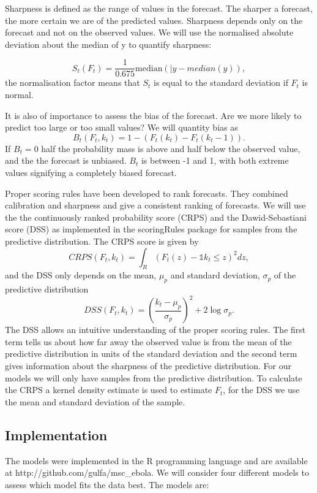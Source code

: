 \documentclass[12pt]{article}
\begin{document}
Sharpness is defined as the range of values in the forecast. The sharper a forecast, the more certain we are of the predicted values. Sharpness depends only on the forecast and not on the observed values. We will use the normalised absolute deviation about the median of y to quantify sharpness:

\[ S_t(F_t) = \frac{1}{0.675} \text{median}(|y - median(y)),\]
the normalisation factor means that $S_t$ is equal to the standard deviation if $F_t$ is normal.

It is also of importance to assess the bias of the forecast. Are we more likely to predict too large or too small values? We will quantity bias as
\[B_t(F_t, k_t) = 1 - (F_t(k_t) - F_t(k_t - 1)).\]
If $B_t=0$ half the probability mass is above and half below the observed value, and the the forecast is unbiased. $B_t$ is between -1 and 1, with both extreme values signifying a completely biased forecast.

Proper scoring rules have been developed to rank forecasts. They combined calibration and sharpness and give a consistent ranking of forecasts. We will use the the continuously ranked probability score (CRPS) and the Dawid-Sebastiani score (DSS) as implemented in the scoringRules package \cite{jordanEvaluatingProbabilisticForecasts2018} for samples from the predictive distribution. The CRPS score is given by 
\[CRPS(F_t,k_t) = \int_R(F_t(z) - \mathds{1}{k_t \leq z})^2 dz,\]
and the DSS only depends on the mean, $\mu_p$ and standard deviation, $\sigma_p$ of the predictive distribution
\[DSS(F_t, k_t) = \left(\frac{k_t- \mu_p}{\sigma_p}\right)^2 + 2\log\sigma_p.\]
The DSS allows an intuitive understanding of the proper scoring rules. The first term tells us about how far away the observed value is from the mean of the predictive distribution in units of the standard deviation and the second term gives information about the sharpness of the predictive distribution. For our models we will only have samples from the predictive distribution. To calculate the CRPS a kernel density estimate is used to estimate $F_t$, for the DSS we use the mean and standard deviation of the sample. 

\subsection{Implementation}
The models were implemented in the R programming language \cite{rcoreteamLanguageEnvironmentStatistical2018} and are available  at http://github.com/gulfa/msc\_ebola. We will consider four different models to assess which model fits the data best. The models are:
\end{document}

